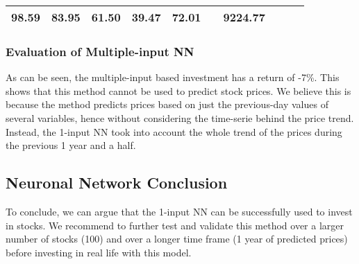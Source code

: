\documentclass[
  11pt,
]{article}
\begin{document}
\begin{longtable}[]{@{}llllllllll@{}}
\begin{minipage}[t]{0.06\columnwidth}
98.59\strut
\end{minipage} & \begin{minipage}[t]{0.06\columnwidth}\raggedright
83.95\strut
\end{minipage} & \begin{minipage}[t]{0.06\columnwidth}\raggedright
61.50\strut
\end{minipage} & \begin{minipage}[t]{0.06\columnwidth}\raggedright
39.47\strut
\end{minipage} & \begin{minipage}[t]{0.06\columnwidth}\raggedright
72.01\strut
\end{minipage} & \begin{minipage}[t]{0.13\columnwidth}\raggedright
\strut
\end{minipage} & \begin{minipage}[t]{0.08\columnwidth}\raggedright
9224.77\strut
\end{minipage}\tabularnewline
\bottomrule
\end{longtable}

\hypertarget{evaluation-of-multiple-input-nn}{%
\subsubsection{Evaluation of Multiple-input
NN}\label{evaluation-of-multiple-input-nn}}

As can be seen, the multiple-input based investment has a return of
-7\%. This shows that this method cannot be used to predict stock
prices. We believe this is because the method predicts prices based on
just the previous-day values of several variables, hence without
considering the time-serie behind the price trend. Instead, the 1-input
NN took into account the whole trend of the prices during the previous 1
year and a half.

\hypertarget{neuronal-network-conclusion}{%
\subsection{Neuronal Network
Conclusion}\label{neuronal-network-conclusion}}

To conclude, we can argue that the 1-input NN can be successfully used
to invest in stocks. We recommend to further test and validate this
method over a larger number of stocks (100) and over a longer time frame
(1 year of predicted prices) before investing in real life with this
model.
\end{document}
